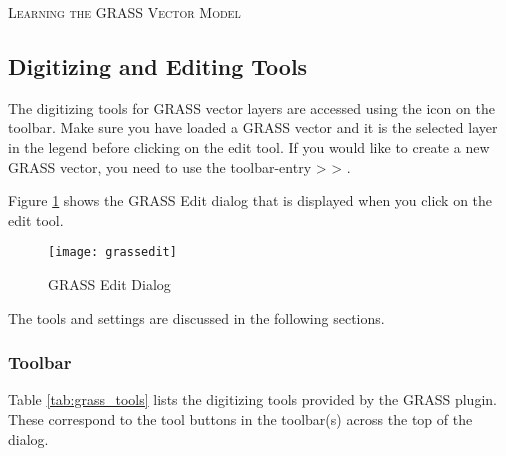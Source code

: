 \begin{Tip}\caption{\textsc{Learning the GRASS Vector Model}}
\end{Tip} 

\subsection{Digitizing and Editing Tools}
\label{grass_digitising}

The digitizing tools for GRASS vector layers are accessed using the
 icon on the toolbar. Make sure
you have loaded a GRASS vector and it is the selected layer in the legend before
clicking on the edit tool. If you would like to create a new GRASS vector, 
you need to use the toolbar-entry  >
 > .

Figure \ref{fig:grass_edit} shows the GRASS Edit dialog that is displayed
when you click on the edit tool. 

\begin{figure}[h]
   \begin{center}
   \caption{GRASS Edit Dialog}\label{fig:grass_edit}\smallskip
   \texttt{[image: grassedit]}
\end{center}  
\end{figure}

The tools and settings are discussed in the following sections.

\subsubsection{Toolbar}\label{label_grasstoolbar}

Table \ref{tab:grass_tools} lists the digitizing tools provided by the GRASS
plugin. These correspond to the tool buttons in the toolbar(s) across the top
of the dialog.

